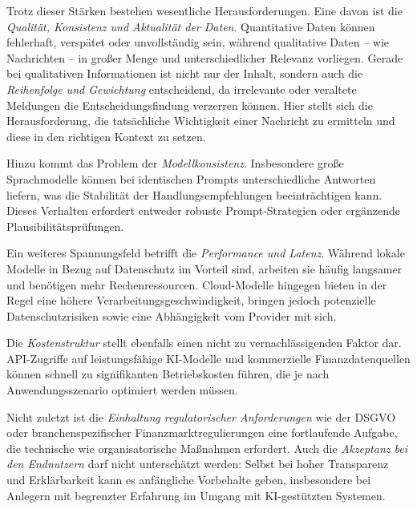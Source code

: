 
    Trotz dieser Stärken bestehen wesentliche Herausforderungen.
    Eine davon ist die \emph{Qualität, Konsistenz und Aktualität der Daten}.
    Quantitative Daten können fehlerhaft, verspätet oder unvollständig sein, während qualitative Daten -- wie Nachrichten -- in großer Menge und unterschiedlicher Relevanz vorliegen.
    Gerade bei qualitativen Informationen ist nicht nur der Inhalt, sondern auch die \emph{Reihenfolge und Gewichtung} entscheidend, da irrelevante oder veraltete Meldungen die Entscheidungsfindung verzerren können.
    Hier stellt sich die Herausforderung, die tatsächliche Wichtigkeit einer Nachricht zu ermitteln und diese in den richtigen Kontext zu setzen.

    Hinzu kommt das Problem der \emph{Modellkonsistenz}.
    Insbesondere große Sprachmodelle können bei identischen Prompts unterschiedliche Antworten liefern, was die Stabilität der Handlungsempfehlungen beeinträchtigen kann.
    Dieses Verhalten erfordert entweder robuste Prompt-Strategien oder ergänzende Plausibilitätsprüfungen.

    Ein weiteres Spannungsfeld betrifft die \emph{Performance und Latenz}.
    Während lokale Modelle in Bezug auf Datenschutz im Vorteil sind, arbeiten sie häufig langsamer und benötigen mehr Rechenressourcen.
    Cloud-Modelle hingegen bieten in der Regel eine höhere Verarbeitungsgeschwindigkeit, bringen jedoch potenzielle Datenschutzrisiken sowie eine Abhängigkeit vom Provider mit sich.

    Die \emph{Kostenstruktur} stellt ebenfalls einen nicht zu vernachlässigenden Faktor dar.
    \acs{API}-Zugriffe auf leistungsfähige \acs{KI}-Modelle und kommerzielle Finanzdatenquellen können schnell zu signifikanten Betriebskosten führen, die je nach Anwendungsszenario optimiert werden müssen.

    Nicht zuletzt ist die \emph{Einhaltung regulatorischer Anforderungen} wie der \acs{DSGVO} oder branchenspezifischer Finanzmarktregulierungen eine fortlaufende Aufgabe, die technische wie organisatorische Maßnahmen erfordert.
    Auch die \emph{Akzeptanz bei den Endnutzern} darf nicht unterschätzt werden:
    Selbst bei hoher Transparenz und Erklärbarkeit kann es anfängliche Vorbehalte geben, insbesondere bei Anlegern mit begrenzter Erfahrung im Umgang mit \acs{KI}-gestützten Systemen.


